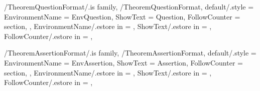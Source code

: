 \newcommand{\InitTheoremHypothesisFormat}
{%
  \ifthenelse{\equal{\GetTheoremHypothesisFormatFollowCounter}{\empty}}%
  {%
    \newtheorem{%
      \GetTheoremHypothesisFormatEnvironmentName}{%
      \GetTheoremHypothesisFormatShowText}%
  }%
  {%
    \newtheorem{%
      \GetTheoremHypothesisFormatEnvironmentName}{%
      \GetTheoremHypothesisFormatShowText}[%
      \GetTheoremHypothesisFormatFollowCounter]%
  }%
} %


\pgfkeys
{
  /TheoremQuestionFormat/.is family, /TheoremQuestionFormat,
  default/.style =
  {
    EnvironmentName = {EnvQuestion},
    ShowText = {Question},
    FollowCounter = section,
  },
  EnvironmentName/.estore in = \GetTheoremQuestionFormatEnvironmentName,
  ShowText/.estore in = \GetTheoremQuestionFormatShowText,
  FollowCounter/.estore in = \GetTheoremQuestionFormatFollowCounter,
} %

\newcommand{\InsertQuestion}[2][\empty]
{%
  \InsertTheoremContent[#1]{\GetTheoremQuestionFormatEnvironmentName}{#2}%
} %

\newcommand{\InitTheoremQuestionFormat}
{%
  \ifthenelse{\equal{\GetTheoremQuestionFormatFollowCounter}{\empty}}%
  {%
    \newtheorem{%
      \GetTheoremQuestionFormatEnvironmentName}{%
      \GetTheoremQuestionFormatShowText}%
  }%
  {%
    \newtheorem{%
      \GetTheoremQuestionFormatEnvironmentName}{%
      \GetTheoremQuestionFormatShowText}[%
      \GetTheoremQuestionFormatFollowCounter]%
  }%
} %


\pgfkeys
{
  /TheoremAssertionFormat/.is family, /TheoremAssertionFormat,
  default/.style =
  {
    EnvironmentName = {EnvAssertion},
    ShowText = {Assertion},
    FollowCounter = section,
  },
  EnvironmentName/.estore in = \GetTheoremAssertionFormatEnvironmentName,
  ShowText/.estore in = \GetTheoremAssertionFormatShowText,
  FollowCounter/.estore in = \GetTheoremAssertionFormatFollowCounter,
} %

\newcommand{\InsertAssertion}[2][\empty]
{%
  \InsertTheoremContent[#1]{\GetTheoremAssertionFormatEnvironmentName}{#2}%
} %

\newcommand{\InitTheoremAssertionFormat}
{%
  \ifthenelse{\equal{\GetTheoremAssertionFormatFollowCounter}{\empty}}%
  {%
    \newtheorem{%
      \GetTheoremAssertionFormatEnvironmentName}{%
      \GetTheoremAssertionFormatShowText}%
  }%
  {%
    \newtheorem{%
      \GetTheoremAssertionFormatEnvironmentName}{%
      \GetTheoremAssertionFormatShowText}[%
      \GetTheoremAssertionFormatFollowCounter]%
  }%
} %

